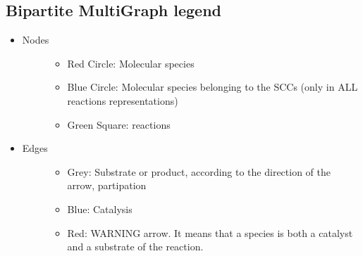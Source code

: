 \documentclass[letterpaper,10pt,english]{sphinxmanual}
\begin{document}
\subsection{Bipartite MultiGraph legend}
\label{graph_chemistry_analysis:bipartite-multigraph-legend}\begin{itemize}
\item {} \begin{description}
\item[{Nodes}] \leavevmode\begin{itemize}
\item {} 
Red Circle: Molecular species

\item {} 
Blue Circle: Molecular species belonging to the SCCs (only in ALL reactions representations)

\item {} 
Green Square: reactions

\end{itemize}

\end{description}

\item {} \begin{description}
\item[{Edges}] \leavevmode\begin{itemize}
\item {} 
Grey: Substrate or product, according to the direction of the arrow, partipation

\item {} 
Blue: Catalysis

\item {} 
Red: WARNING arrow. It means that a species is both a catalyst and a substrate of the reaction.

\end{itemize}

\end{description}

\end{itemize}
\end{document}
